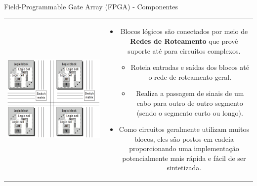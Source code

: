 \documentclass[aspectratio=169]{beamer}
\begin{document}
	
	\begin{frame}{Field-Programmable Gate Array (FPGA) - Componentes}
		
		\begin{tabular}{cc}
			\begin{minipage}{0.35\textwidth}
				\includegraphics[height=0.62\textheight]{img/print/componentes-fpga.png}
			\end{minipage}
			&
			\begin{minipage}{0.65\textwidth}
				\begin{itemize}
					\setlength\itemsep{1em}
					\item Blocos lógicos são conectados por meio de \textbf{Redes de Roteamento} que provê suporte até para circuitos complexos.
					\begin{itemize}
						\item Roteia entradas e saídas dos blocos até o rede de roteamento geral.
						\item Realiza a passagem de sinais de um cabo para outro de outro segmento (sendo o segmento curto ou longo).
					\end{itemize}
					
					\item Como circuitos geralmente utilizam muitos blocos, eles são postos em cadeia proporcionando uma implementação potencialmente mais rápida e fácil de ser sintetizada.
					
				\end{itemize}
			\end{minipage}
		\end{tabular}
	\end{frame}
	
\end{document}
